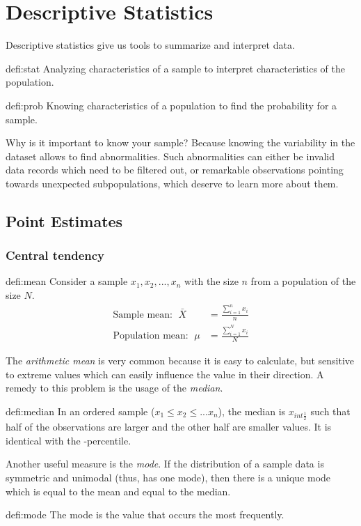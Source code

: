 \section{Descriptive Statistics}
	Descriptive statistics give us tools to summarize and interpret data.
	\begin{defi}[Statistics]{defi:stat}
		Analyzing characteristics of a sample to interpret characteristics of the population. 
	\end{defi}
	\begin{defi}{defi:prob}
		Knowing characteristics of a population to find the probability for a sample.
	\end{defi}		
	Why is it important to know your sample? Because knowing the variability in the dataset allows to find abnormalities. Such abnormalities can either be invalid data records which need to be filtered out, or remarkable observations pointing towards unexpected subpopulations, which deserve to learn more about them.
\subsection{Point Estimates}
	\subsubsection{Central tendency}
		\begin{defi}{defi:mean}
			Consider a sample $x_1,x_2,...,x_n$ with the size $n$ from a population of the size $N$.
			\begin{align*}
				\text{Sample mean: }\;\bar{X}&=\frac{\sum\limits_{i=1}^{n}x_i}{n}\\
				\text{Population mean: }\;\mu&=\frac{\sum\limits_{i=1}^{N}x_i}{N}		
			\end{align*}			
		\end{defi}
		The \emph{arithmetic mean} is very common because it is easy to calculate, but sensitive to extreme values which can easily influence the value in their direction. A remedy to this problem is the usage of the \emph{median}.
		\begin{defi}[Median]{defi:median}
		In an ordered sample ($x_1\leq x_2 \leq ... x_n$), the median is $x_{int \frac{1}{2}}$ such that half of the observations are larger and the other half are smaller values. It is identical with the -percentile.
		\end{defi}
		Another useful measure is the \emph{mode}. If the distribution of a sample data is symmetric and unimodal (thus, has one mode), then there is a unique mode which is equal to the mean and equal to the median.
		\begin{defi}[Mode]{defi:mode}
			The mode is the value that occurs the most frequently.
		\end{defi}
